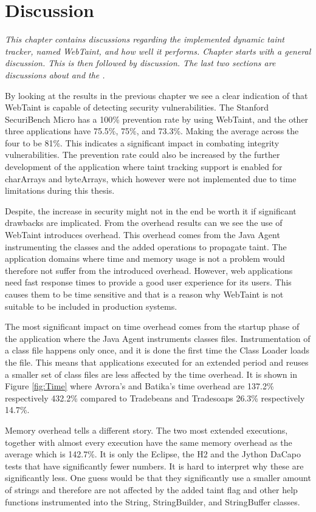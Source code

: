 \chapter{Discussion}
\label{Discussion}
\textit{This chapter contains discussions regarding the implemented dynamic taint tracker, named WebTaint, and how well it performs. Chapter starts with a general discussion. This is then followed by \textit{} discussion. The last two sections are discussions about \textit{} and the \textit{}.}

By looking at the results in the previous chapter we see a clear indication of that WebTaint is capable of detecting security vulnerabilities. The Stanford SecuriBench Micro has a 100\% prevention rate by using WebTaint, and the other three applications have 75.5\%, 75\%, and 73.3\%. Making the average across the four to be 81\%. This indicates a significant impact in combating integrity vulnerabilities. The prevention rate could also be increased by the further development of the application where taint tracking support is enabled for charArrays and byteArrays, which however were not implemented due to time limitations during this thesis.

Despite, the increase in security might not in the end be worth it if significant drawbacks are implicated. From the overhead results can we see the use of WebTaint introduces overhead. This overhead comes from the Java Agent instrumenting the classes and the added operations to propagate taint. The application domains where time and memory usage is not a problem would therefore not suffer from the introduced overhead. However, web applications need fast response times to provide a good user experience for its users. This causes them to be time sensitive and that is a reason why WebTaint is not suitable to be included in production systems.

The most significant impact on time overhead comes from the startup phase of the application where the Java Agent instruments classes files. Instrumentation of a class file happens only once, and it is done the first time the Class Loader loads the file. This means that applications executed for an extended period and reuses a smaller set of class files are less affected by the time overhead. It is shown in Figure \ref{fig:Time} where Avrora's and Batika's time overhead are 137.2\% respectively 432.2\% compared to Tradebeans and Tradesoaps 26.3\% respectively 14.7\%.

Memory overhead tells a different story. The two most extended executions, together with almost every execution have the same memory overhead as the average which is 142.7\%. It is only the Eclipse, the H2 and the Jython DaCapo tests that have significantly fewer numbers. It is hard to interpret why these are significantly less. One guess would be that they significantly use a smaller amount of strings and therefore are not affected by the added taint flag and other help functions instrumented into the String, StringBuilder, and StringBuffer classes.



